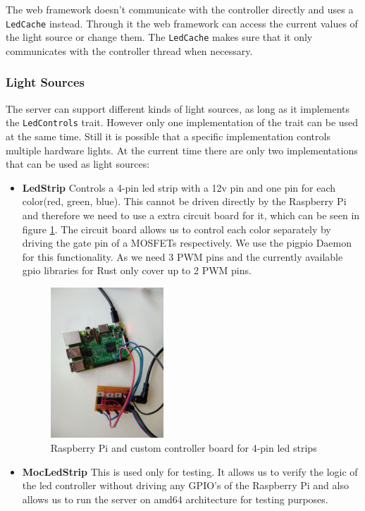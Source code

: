 \documentclass[conference]{IEEEtran}
\begin{document}
The web framework doesn't communicate with the controller directly and uses a \texttt{LedCache} instead. Through it the web
framework can access the current values of the light source or change them. The \texttt{LedCache} makes sure that it only communicates
with the controller thread when necessary.


\subsubsection{Light Sources}
The server can support different kinds of light sources, as long as it implements the \texttt{LedControls} trait. However only one
implementation of the trait can be used at the same time. Still it is possible that a specific implementation controls multiple
hardware lights. At the current time there are only two implementations that can be used as light sources:

\begin{itemize}
   \item \textbf{LedStrip}
   Controls a 4-pin led strip with a 12v pin and one pin for each color(red, green, blue). This cannot be driven directly by the
   Raspberry Pi and therefore we need to use a extra circuit board\cite{rpiled} for it, which can be seen in figure \ref{hardware}. The circuit board allows us to control each
   color separately by driving the gate pin of a MOSFETs respectively. We use the pigpio Daemon\cite{pigpiod} for this functionality.
   As we need 3 PWM pins and the currently available gpio libraries for Rust only cover up to 2 PWM pins.
  
   \begin{figure}[H]
       \centering
       \includegraphics[width=0.4\textwidth]{board}
       \caption{Raspberry Pi and custom controller board for 4-pin led strips}
       \label{hardware}
   \end{figure}

   \item \textbf{MocLedStrip}
   This is used only for testing. It allows us to verify the logic of the led controller without driving any GPIO's of the
   Raspberry Pi and also allows us to run the server on amd64 architecture for testing purposes.
\end{itemize}
\end{document}
